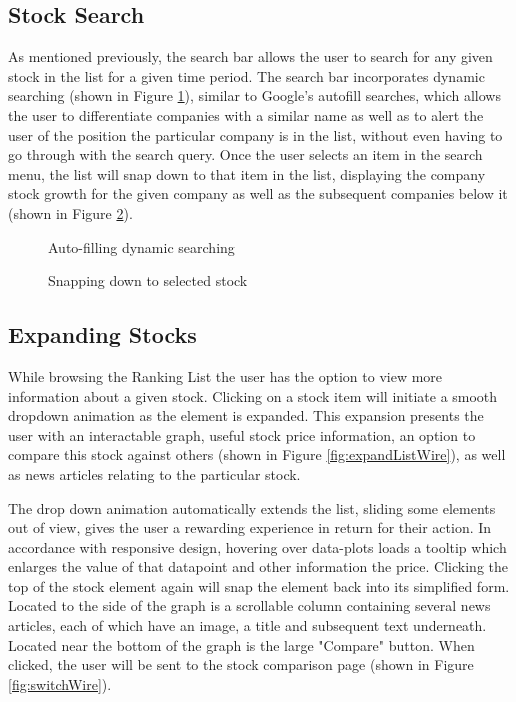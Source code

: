 \documentclass[11pt]{article}
\numberwithin{figure}{section}
\begin{document}
    \subsection{Stock Search}
        As mentioned previously, the search bar allows the user to search for any given stock in the list for a given time period. The search bar incorporates dynamic searching (shown in Figure \ref{fig:listSearchWire}), similar to Google’s autofill searches, which allows the user to differentiate companies with a similar name as well as to alert the user of the position the particular company is in the list, without even having to go through with the search query. Once the user selects an item in the search menu, the list will snap down to that item in the list, displaying the company stock growth for the given company as well as the subsequent companies below it (shown in Figure \ref{fig:listSearchResultWire}).
       
        \begin{figure}[htp]
            \centering
            \caption{Auto-filling dynamic searching}
            \label{fig:listSearchWire}
        \end{figure}
        
        \begin{figure}[htp]
            \centering
            \caption{Snapping down to selected stock}
            \label{fig:listSearchResultWire}
        \end{figure}
       
    \subsection{Expanding Stocks}
        While browsing the Ranking List the user has the option to view more information about a given stock. Clicking on a stock item will initiate a smooth dropdown animation as the element is expanded. This expansion presents the user with an interactable graph, useful stock price information, an option to compare this stock against others (shown in Figure \ref{fig:expandListWire}), as well as news articles relating to the particular stock.

        \bigskip
        \noindent
        The drop down animation automatically extends the list, sliding some elements out of view, gives the user a rewarding experience in return for their action. In accordance with responsive design, hovering over data-plots loads a tooltip which enlarges the value of that datapoint and other information the price.  Clicking the top of the stock element again will snap the element back into its simplified form. Located to the side of the graph is a scrollable column containing several news articles, each of which have an image, a title and subsequent text underneath. Located near the bottom of the graph is the large "Compare" button. When clicked, the user will be sent to the stock comparison page (shown in Figure \ref{fig:switchWire}).
        
\end{document}

